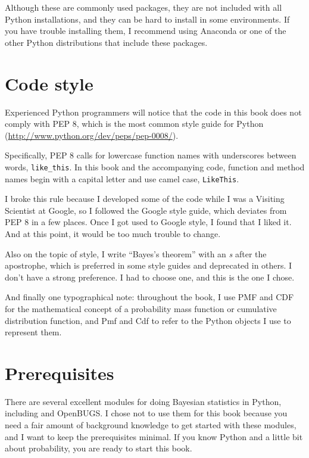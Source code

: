 \documentclass[12pt]{book}
\theoremstyle{exercise}
\begin{document}
Although these are commonly used packages, they are not included with
all Python installations, and they can be hard to install in some
environments.  If you have trouble installing them, I
recommend using Anaconda or one of the other Python distributions
that include these packages.



\section{Code style}

Experienced Python programmers will notice that the code in this
book does not comply with PEP 8, which is the most common
style guide for Python (\url{http://www.python.org/dev/peps/pep-0008/}).

Specifically, PEP 8 calls for lowercase function names with
underscores between words, \verb"like_this".  In this book and
the accompanying code, function and method names begin with
a capital letter and use camel case, \verb"LikeThis".

I broke this rule because I developed some of the code
while I was a Visiting Scientist at Google, so I followed
the Google style guide, which deviates from PEP 8 in a few
places.  Once I got used to Google style, I found that I liked
it.  And at this point, it would be too much trouble to change.

Also on the topic of style, I write ``Bayes's theorem''
with an {\it s} after the apostrophe, which is preferred in some
style guides and deprecated in others.  I don't have a strong
preference.  I had to choose one, and this is the one I chose.

And finally one typographical note: throughout the book, I use
PMF and CDF for the mathematical concept of a probability
mass function or cumulative distribution function, and Pmf and Cdf
to refer to the Python objects I use to represent them.


\section{Prerequisites}

There are several excellent modules for doing Bayesian statistics in
Python, including  and OpenBUGS.  I chose not to use them
for this book because you need a fair amount of background knowledge
to get started with these modules, and I want to keep the
prerequisites minimal.  If you know Python and a little bit about
probability, you are ready to start this book.
\end{document}
